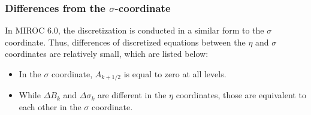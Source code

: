 \hypertarget{differences-from-the-sigma-coordinate}{%
\subsubsection{\texorpdfstring{Differences from the
\(\sigma\)-coordinate}{Differences from the \textbackslash{}sigma-coordinate}}\label{differences-from-the-sigma-coordinate}}

In MIROC 6.0, the discretization is conducted in a similar form to the \(\sigma\) coordinate.
Thus, differences of discretized equations between the $\eta$ and $\sigma$ coordinates are relatively small, which are listed below:

\begin{itemize}
\tightlist
\item
  In the $\sigma$ coordinate, \(A_{k+1/2}\) is equal to zero at all levels.
\item
  While \(\Delta B_k\) and \(\Delta \sigma_k\) are different in the $\eta$ coordinates, those are equivalent to each other in the \(\sigma\) coordinate.
\end{itemize}

